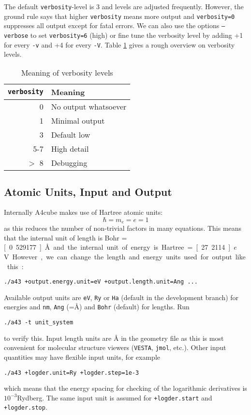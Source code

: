 \documentclass[oribibl]{llncs}
\newcommand{\ttt}[1]{\texttt{#1}}
\newcommand{\codename}{A4cube}
\begin{document}

The default \ttt{verbosity}-level is $3$ and levels are adjusted frequently.
However, the ground rule says that higher \ttt{verbosity} means more output
and \ttt{verbosity=0} suppresses all output except for fatal errors.
We can also use the options \ttt{--verbose} to set \ttt{verbosity=6} (high)
or fine tune the verbosity level by adding +1 for every \ttt{-v} and +4 for every \ttt{-V}.
Table \ref{tab:verbosity-level-meaning} gives a rough overview on verbosity levels. 

\begin{table}[ht!]
\caption[Meaning of verbosity levels]{
Meaning of verbosity levels
} \label{tab:verbosity-level-meaning}
\centering
\begin{tabular}{|r|l|}
\hline
  \ttt{verbosity} & Meaning   \\
\hline
     0 & No output whatsoever \\
     1 & Minimal output       \\
     3 & Default low          \\
   5-7 & High detail          \\
 $>$ 8 & Debugging            \\
\hline
\end{tabular}
\end{table}


\subsection{Atomic Units, Input and Output}
Internally \codename{} makes use of Hartree atomic units:
\begin{equation}
	\hbar = m_e = e = 1
\end{equation}
as this reduces the number of non-trivial factors in many equations.
This means that the internal unit of length is Bohr = \unit[0.529177]{\AA{}}
and the internal unit of energy is Hartree = \unit[27.2114]{$e$V}.
However, we can change the length and energy units used for output like this:
\begin{verbatim}
./a43 +output.energy.unit=eV +output.length.unit=Ang ...
\end{verbatim}
Available output units are \ttt{eV}, \ttt{Ry} or \ttt{Ha} (default in the development branch) for energies 
and \ttt{nm}, \ttt{Ang} (=\AA) and \ttt{Bohr} (default) for lengths. Run
\begin{verbatim}
./a43 -t unit_system
\end{verbatim}
to verify this.
Input length units are \AA{} in the geometry file as this is most convenient for molecular structure viewers
(\ttt{VESTA}, \ttt{jmol}, etc.). Other input quantities may have flexible input units, for example
\begin{verbatim}
./a43 +logder.unit=Ry +logder.step=1e-3
\end{verbatim}
which means that the energy spacing for checking of the logarithmic derivatives is $10^{-3}$Rydberg.
The same input unit is assumed for \ttt{+logder.start} and \ttt{+logder.stop}.
\end{document}
